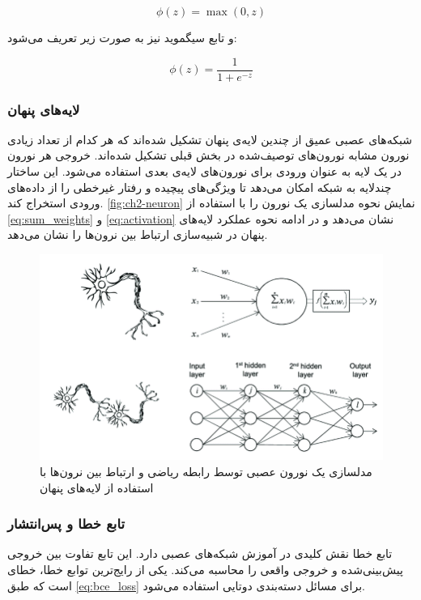 \begin{latin}
\begin{equation}
\label{eq:relu}
\phi(z) = \max(0, z)
\end{equation}
\end{latin}

و تابع سیگموید نیز به صورت زیر تعریف می‌شود:

\begin{latin}
\begin{equation}
\label{eq:sigmoid}
\phi(z) = \frac{1}{1 + e^{-z}}
\end{equation}
\end{latin}


\subsubsection{لایه‌های پنهان}
شبکه‌های عصبی عمیق از چندین لایه‌ی پنهان تشکیل شده‌اند که هر کدام از تعداد زیادی نورون مشابه نورون‌های توصیف‌شده در بخش قبلی تشکیل شده‌اند. خروجی هر نورون در یک لایه به عنوان ورودی برای نورون‌های لایه‌ی بعدی استفاده می‌شود. این ساختار چندلایه به شبکه امکان می‌دهد تا ویژگی‌های پیچیده و  رفتار غیرخطی را از داده‌های ورودی استخراج کند.
\autoref{fig:ch2-neuron}
نمایش نحوه مدلسازی یک نورون را با استفاده از 
\autoref{eq:sum_weights} و \autoref{eq:activation}
نشان می‌دهد و در ادامه نحوه عملکرد لایه‌های پنهان در شبیه‌سازی ارتباط بین نرون‌ها را نشان می‌دهد. 
\begin{figure}[h]
\centering
\includegraphics[width=1.0\linewidth]{Images/Chapter2/neuron}
\caption{مدلسازی یک نورون عصبی توسط رابطه ریاضی و ارتباط بین نرون‌ها با استفاده از لایه‌های پنهان
\cite{brainmentorsIntroductionDeep}}
\label{fig:ch2-neuron}
\end{figure}


\subsubsection{تابع خطا و پس‌انتشار
\protect{}}
تابع خطا
  نقش کلیدی در آموزش شبکه‌های عصبی دارد. این تابع تفاوت بین خروجی پیش‌بینی‌شده
   و خروجی واقعی
     را محاسبه می‌کند. یکی از رایج‌ترین توابع خطا، خطای 
   است که طبق 
   \autoref{eq:bce_loss}
   برای مسائل دسته‌بندی دوتایی استفاده می‌شود.

